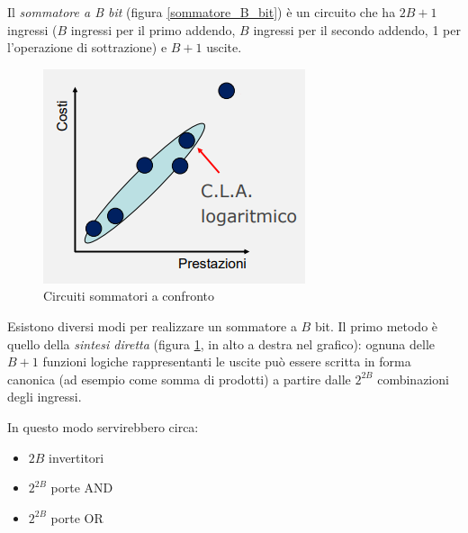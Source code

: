 \documentclass{article}
\begin{document}
Il \textit{sommatore a B bit} (figura \ref{sommatore_B_bit}) è un circuito che ha $2B + 1$ ingressi ($B$ ingressi per il primo addendo, $B$ ingressi per il secondo addendo, 1 per l'operazione di sottrazione) e $B + 1$ uscite.

\begin{figure}[h]
  \centering
  \includegraphics[scale=0.7]{IM_grafici_sommatori}
  \caption{Circuiti sommatori a confronto}
  \label{grafici_sommatori}
\end{figure}

Esistono diversi modi per realizzare un sommatore a $B$ bit. Il primo metodo è quello della \textit{sintesi diretta} (figura \ref{grafici_sommatori}, in alto a destra nel grafico): ognuna delle $B+1$ funzioni logiche rappresentanti le uscite può essere scritta in forma canonica (ad esempio come somma di prodotti) a partire dalle $2^{2B}$ combinazioni degli ingressi. 

\vspace{1mm}

In questo modo servirebbero circa:
\begin{itemize}
  \item $2B$ invertitori
  \item $2^{2B}$ porte AND
  \item $2^{2B}$ porte OR
\end{itemize}
\end{document}
